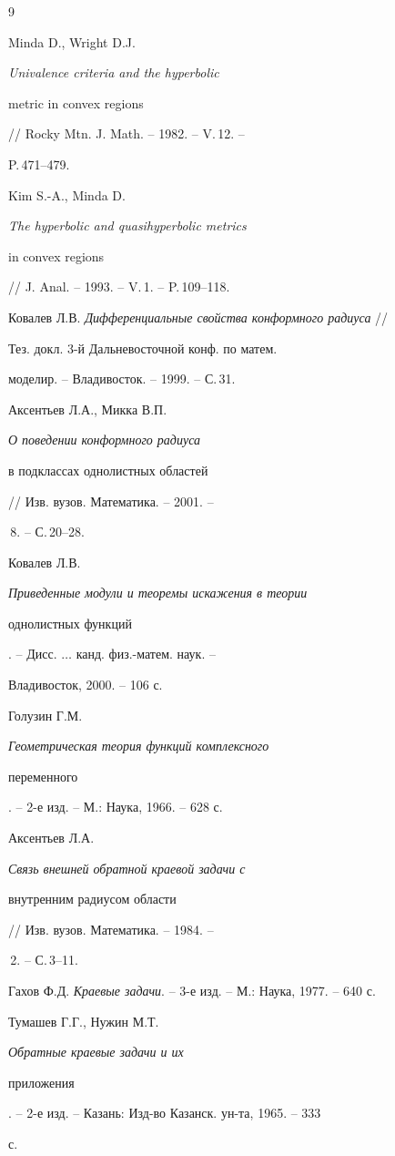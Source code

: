 \begin{thebibliography}{9} 


 




Minda D., Wright D.J. {\em Univalence criteria and the hyperbolic 


metric in convex regions} // Rocky Mtn. J. Math. -- 1982. -- V.\,12. -- 


P.\,471--479. 




Kim S.-A., Minda D. {\em The hyperbolic and quasihyperbolic metrics 


in convex regions} // J. Anal. -- 1993. -- V.\,1. -- P.\,109--118. 




Ковалев Л.В. {\em Дифференциальные свойства конформного радиуса} // 


Тез. докл. 3-й Дальневосточной конф. по матем. 


моделир. -- Владивосток. -- 1999. -- С.\,31. 




Аксентьев Л.А., Микка В.П. {\em О поведении конформного радиуса 


в подклассах однолистных областей} // Изв. вузов. Математика. -- 2001. -- 


\No\,8. -- С.\,20--28. 




Ковалев Л.В. {\em Приведенные модули и теоремы искажения в теории 


однолистных функций}. -- Дисс. $\dotsc$ канд. физ.-матем. наук. -- 


Владивосток, 2000. -- 106 с. 




Голузин Г.М. {\em Геометрическая теория функций комплексного 


переменного}. -- 2-е изд. -- М.: Наука, 1966. -- 628 с. 




Аксентьев Л.А. {\em Связь внешней обратной краевой задачи с 


внутренним радиусом области} // Изв. вузов. Математика. -- 1984. -- 


\No\,2. -- С.\,3--11. 




Гахов Ф.Д. {\em Краевые задачи}. -- 3-е изд. -- М.: Наука, 1977. -- 640 с. 




Тумашев Г.Г., Нужин М.Т. {\em Обратные краевые задачи и их 


приложения}. -- 2-е изд. -- Казань: Изд-во Казанск. ун-та, 1965. -- 333 


с. 


 


\end{thebibliography} 


 


\vskip 2cm 


 






 


\label{end} 


 


